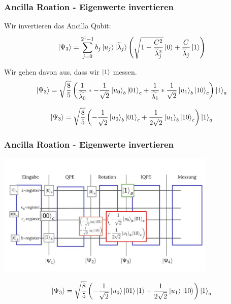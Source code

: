 \begin{frame}
    \frametitle{Ancilla Roation - Eigenwerte invertieren}
    Wir invertieren das Ancilla Qubit:
    $$ \ket{\Psi_3} = \sum_{j=0}^{2^{1}-1} b_j \ket{u_j} \ket{\widetilde{\lambda}_j} \left(\sqrt{1-\frac{C^2}{\widetilde{\lambda}_j^2}}\ket{0} + \frac{C}{\widetilde{\lambda}_j} \ket{1}\right)$$


    \hfil

    Wir gehen davon aus, dass wir $\ket{1}$ messen.
    $$  \ket{\Psi_3} =\sqrt{\frac{8}{5}}\left(\frac {1} {\widetilde{\lambda_0}} *-\frac{1}{\sqrt{2}} \ket{u_0}_b\ket{01}_c +\frac{1}{\widetilde{\lambda_1}}*\frac{1}{\sqrt{2}} \ket{u_1}_b\ket{10}_c\right)\ket{1}_a $$
    
    $$  \ket{\Psi_3} =\sqrt{\frac{8}{5}}\left(-\frac{1}{\sqrt{2}} \ket{u_0}_b\ket{01}_c +\frac{1}{2\sqrt{2}} \ket{u_1}_b\ket{10}_c\right)\ket{1}_a $$
\end{frame}

\begin{frame}
    \frametitle{Ancilla Roation - Eigenwerte invertieren}
    \begin{center}

    \includegraphics[width=10.5cm]{img/example_circuit/example_circuit_3.jpg}
    \end{center}
    $$ \ket{\Psi_3} =\sqrt{\frac{8}{5}}\left(-\frac{1}{\sqrt{2}} \ket{u_0}\ket{01}\ket{1} +\frac{1}{2\sqrt{2}} \ket{u_1} \ket{10}\right)\ket{1}_a$$
\end{frame}

